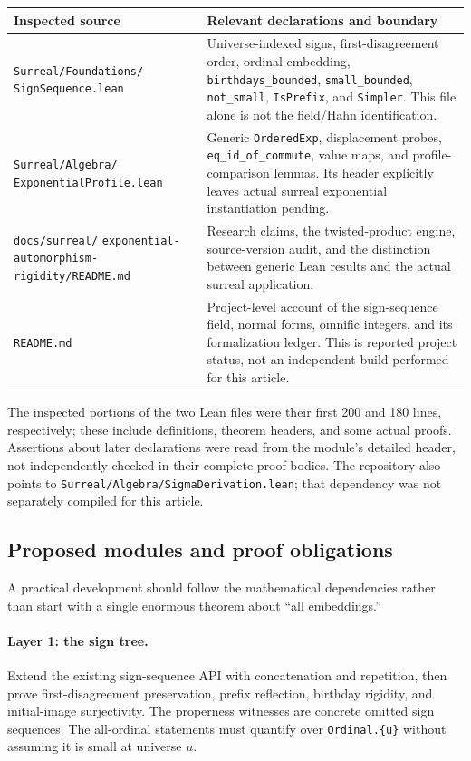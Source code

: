 \documentclass[11pt,a4paper]{article}
\numberwithin{equation}{section}
\theoremstyle{plain}
\theoremstyle{definition}
\theoremstyle{remark}
\newcommand{\code}[1]{\texttt{\small #1}}
\begin{document}
\begin{longtable}{P{68mm}P{82mm}}
\toprule
Inspected source & Relevant declarations and boundary \\
\midrule
\endhead
\code{Surreal/Foundations/}\newline
\code{SignSequence.lean}
& Universe-indexed signs, first-disagreement order, ordinal embedding,
\code{birthdays\_bounded}, \code{small\_bounded}, \code{not\_small},
\code{IsPrefix}, and \code{Simpler}. This file alone is not the field/Hahn
identification. \\
\code{Surreal/Algebra/}\newline
\code{ExponentialProfile.lean}
& Generic \code{OrderedExp}, displacement probes,
\code{eq\_id\_of\_commute}, value maps, and profile-comparison lemmas.
Its header explicitly leaves actual surreal exponential instantiation
pending. \\
\code{docs/surreal/}\newline
\code{exponential-automorphism-}\newline
\code{rigidity/README.md}
& Research claims, the twisted-product engine, source-version audit,
and the distinction between generic Lean results and the actual surreal
application. \\
\code{README.md}
& Project-level account of the sign-sequence field, normal forms,
omnific integers, and its formalization ledger. This is reported project
status, not an independent build performed for this article. \\
\bottomrule
\end{longtable}

The inspected portions of the two Lean files were their first 200 and
180 lines, respectively; these include definitions, theorem headers, and
some actual proofs. Assertions about later declarations were read from
the module's detailed header, not independently checked in their complete
proof bodies. The repository also points to
\code{Surreal/Algebra/SigmaDerivation.lean}; that dependency was not separately
compiled for this article.

\subsection{Proposed modules and proof obligations}
A practical development should follow the mathematical dependencies rather
than start with a single enormous theorem about ``all embeddings.''

\paragraph{Layer 1: the sign tree.}
Extend the existing sign-sequence API with concatenation and repetition,
then prove first-disagreement preservation, prefix reflection, birthday
rigidity, and initial-image surjectivity. The properness witnesses are
concrete omitted sign sequences. The all-ordinal statements must quantify
over \code{Ordinal.\{u\}} without assuming it is small at universe $u$.
\end{document}
